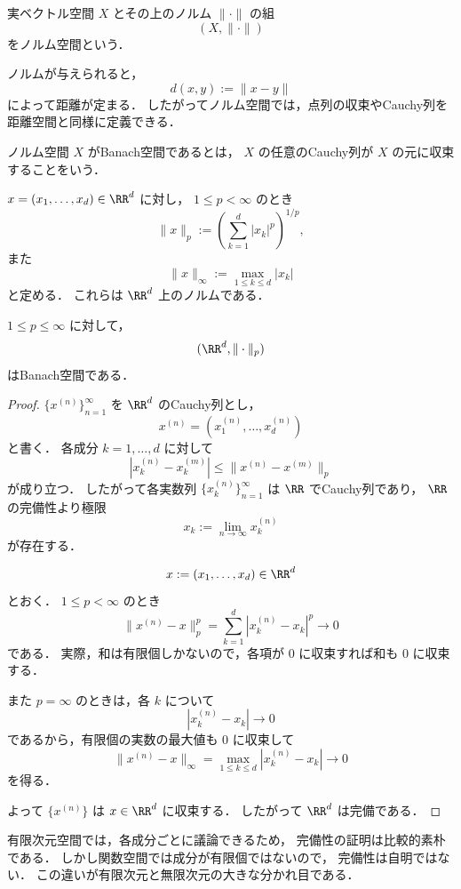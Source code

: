 \begin{definition}[ノルム空間]
実ベクトル空間 $X$ とその上のノルム $\|\cdot\|$ の組
\[
(X,\|\cdot\|)
\]
をノルム空間という．
\end{definition}

\begin{remark}
ノルムが与えられると，
\[
d(x,y):=\|x-y\|
\]
によって距離が定まる．
したがってノルム空間では，点列の収束やCauchy列を距離空間と同様に定義できる．
\end{remark}

\begin{definition}[Banach空間]
ノルム空間 $X$ がBanach空間であるとは，
$X$ の任意のCauchy列が $X$ の元に収束することをいう．
\end{definition}

\begin{example}
$x=(x_1,\dots,x_d)\in\RR^d$ に対し，
$1\le p<\infty$ のとき
\[
\|x\|_p:=\left(\sum_{k=1}^d |x_k|^p\right)^{1/p},
\]
また
\[
\|x\|_\infty:=\max_{1\le k\le d}|x_k|
\]
と定める．
これらは $\RR^d$ 上のノルムである．
\end{example}

\begin{proposition}
$1\le p\le\infty$ に対して，
\[
(\RR^d,\|\cdot\|_p)
\]
はBanach空間である．
\end{proposition}
\begin{proof}
$\{x^{(n)}\}_{n=1}^{\infty}$ を $\RR^d$ のCauchy列とし，
\[
x^{(n)}=(x_1^{(n)},\dots,x_d^{(n)})
\]
と書く．
各成分 $k=1,\dots,d$ に対して
\[
|x_k^{(n)}-x_k^{(m)}|
\le
\|x^{(n)}-x^{(m)}\|_p
\]
が成り立つ．
したがって各実数列 $\{x_k^{(n)}\}_{n=1}^{\infty}$ は $\RR$ でCauchy列であり，
$\RR$ の完備性より極限
\[
x_k:=\lim_{n\to\infty}x_k^{(n)}
\]
が存在する．

\[
x:=(x_1,\dots,x_d)\in\RR^d
\]
とおく．
$1\le p<\infty$ のとき
\[
\|x^{(n)}-x\|_p^p
=
\sum_{k=1}^d |x_k^{(n)}-x_k|^p
\to 0
\]
である．
実際，和は有限個しかないので，各項が $0$ に収束すれば和も $0$ に収束する．

また $p=\infty$ のときは，各 $k$ について
\[
|x_k^{(n)}-x_k|\to 0
\]
であるから，有限個の実数の最大値も $0$ に収束して
\[
\|x^{(n)}-x\|_\infty
=
\max_{1\le k\le d}|x_k^{(n)}-x_k|
\to 0
\]
を得る．

よって $\{x^{(n)}\}$ は $x\in\RR^d$ に収束する．
したがって $\RR^d$ は完備である．
\end{proof}

\begin{remark}
有限次元空間では，各成分ごとに議論できるため，
完備性の証明は比較的素朴である．
しかし関数空間では成分が有限個ではないので，
完備性は自明ではない．
この違いが有限次元と無限次元の大きな分かれ目である．
\end{remark}

